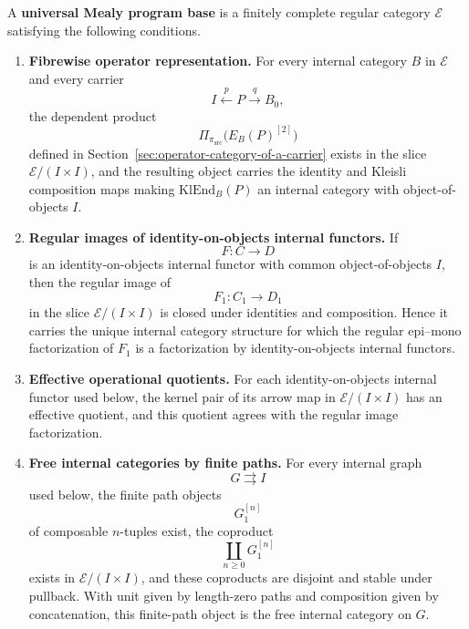 \begin{definition}
\label{def:universal-mealy-program-base}
A \textbf{universal Mealy program base} is a finitely complete regular category \(\mathcal E\)
satisfying the following conditions.

\begin{enumerate}
    \item \textbf{Fibrewise operator representation.}
    For every internal category \(B\) in \(\mathcal E\) and every carrier
    \[
            I\xleftarrow{p}P\xrightarrow{q}B_0,
    \]
    the dependent product
    \[
            \Pi_{\pi_{\mathrm{src}}}\bigl(E_B(P)^{[2]}\bigr)
    \]
    defined in Section~\ref{sec:operator-category-of-a-carrier} exists in the slice
    \(\mathcal E/(I\times I)\), and the resulting object carries the identity and Kleisli
    composition maps making \(\mathrm{KlEnd}_B(P)\) an internal category with object-of-objects
    \(I\).

    \item \textbf{Regular images of identity-on-objects internal functors.}
    If
    \[
            F:C\longrightarrow D
    \]
    is an identity-on-objects internal functor with common object-of-objects \(I\), then the
    regular image of
    \[
            F_1:C_1\longrightarrow D_1
    \]
    in the slice \(\mathcal E/(I\times I)\) is closed under identities and composition.  Hence it
    carries the unique internal category structure for which the regular epi--mono factorization
    of \(F_1\) is a factorization by identity-on-objects internal functors.

    \item \textbf{Effective operational quotients.}
    For each identity-on-objects internal functor used below, the kernel pair of its arrow map in
    \(\mathcal E/(I\times I)\) has an effective quotient, and this quotient agrees with the
    regular image factorization.

    \item \textbf{Free internal categories by finite paths.}
    For every internal graph
    \[
            G\rightrightarrows I
    \]
    used below, the finite path objects
    \[
            G_1^{[n]}
    \]
    of composable \(n\)-tuples exist, the coproduct
    \[
            \coprod_{n\geq 0}G_1^{[n]}
    \]
    exists in \(\mathcal E/(I\times I)\), and these coproducts are disjoint and stable under
    pullback.  With unit given by length-zero paths and composition given by concatenation, this
    finite-path object is the free internal category on \(G\).
\end{enumerate}
\end{definition}


